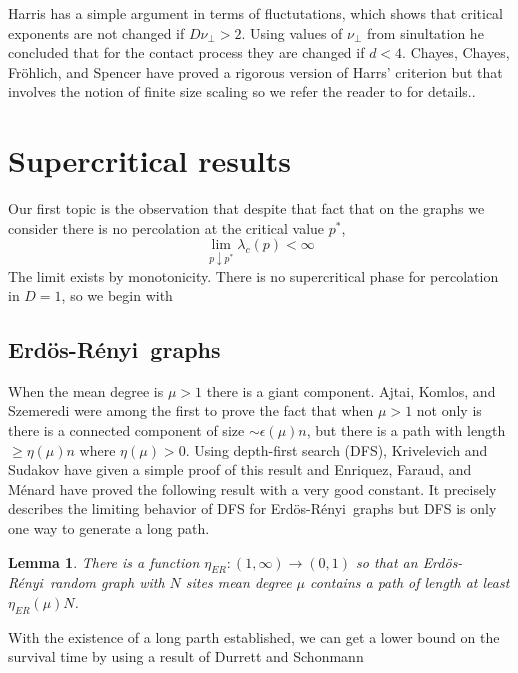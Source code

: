 \documentclass[11pt]{article}
\def\clearp{}
\newtheorem{lemma}{Lemma}[section]
\theoremstyle{definition}
\def\ep{\epsilon}
\def\ER{Erd\"os-R\'enyi\ }
\begin{document}
Harris has a simple argument in terms of fluctutations, which shows that critical exponents are not changed if $D\nu_\perp> 2$. Using values of $\nu_\perp$ from sinultation he concluded that for the contact process they are changed if $d<4$. Chayes, Chayes, Fr\"ohlich, and Spencer \cite{CCFS} have proved a rigorous version of Harrs' criterion but that involves the notion of finite size scaling so we refer the reader to \cite{CCFS} for details..





\clearp

\section{Supercritical results}

Our first topic is the observation that despite that fact that on the graphs we consider there is no percolation at the critical value $p^*$,
$$
\lim_{p \downarrow p^*} \lambda_c(p) < \infty
$$
The limit exists by monotonicity.
 There is no supercritical phase for percolation in $D=1$, so we begin with 

\subsection{\ER graphs}

When the mean degree  is $\mu >1$ there is a giant component. Ajtai, Komlos, and Szemeredi \cite{Ajtai} were among the first to prove the fact that when $\mu>1$ not only is there is a connected component of size $\sim\ep(\mu)n$, but there is a path with length $\ge \eta(\mu)n$ where $\eta(\mu)>0$.  Using depth-first search (DFS), Krivelevich and Sudakov \cite{KriSud} have given a simple proof of this result and Enriquez, Faraud, and M\'enard \cite{EFM} have proved the following result with a very good constant. It precisely describes the limiting behavior of DFS for \ER graphs but DFS is only one way to generate a long path.

\begin{lemma} \label{longpER}
There is a function $\eta_{ER}: (1,\infty) \to (0,1)$ so that an \ER random graph with $N$ sites mean degree $\mu$ contains a path of length at least $\eta_{ER}(\mu)N$.
\end{lemma}

With the existence of a long parth established, we can get a lower bound on the survival time by using a result of Durrett and Schonmann \cite{DurSch}  
\end{document}
